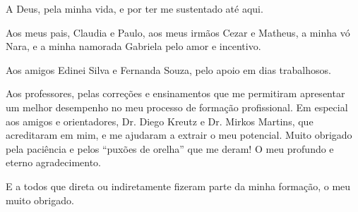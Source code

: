 \begin{agradecimentos}

A Deus, pela minha vida, e por ter me sustentado até aqui. 

Aos meus pais, Claudia e Paulo, aos meus irmãos Cezar e Matheus, a minha vó Nara, e a minha namorada Gabriela pelo amor e incentivo. 

Aos amigos Edinei Silva e Fernanda Souza, pelo apoio em dias trabalhosos.

Aos professores, pelas correções e ensinamentos que me permitiram apresentar um melhor desempenho no meu processo de formação profissional. Em especial aos amigos e orientadores, Dr. Diego Kreutz e Dr. Mirkos Martins, que acreditaram em mim, e me ajudaram a extrair o meu potencial. Muito obrigado pela paciência e pelos ``puxões de orelha'' que me deram! O meu profundo e eterno agradecimento. 

E a todos que direta ou indiretamente fizeram parte da minha formação, o meu muito obrigado.

\end{agradecimentos}
